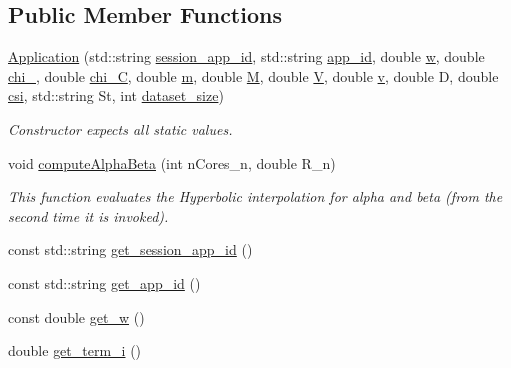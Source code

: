 \subsection*{Public Member Functions}
\begin{DoxyCompactItemize}
\item 
\hyperlink{classApplication_a3413eb5b5ba7bd2d1dfe2ce6d2e28c48}{Application} (std\-::string \hyperlink{classApplication_a6152c40564d526b9b60871c98f7a51c7}{session\-\_\-app\-\_\-id}, std\-::string \hyperlink{classApplication_a5cedee59cfd3cbf89d02174e2f521493}{app\-\_\-id}, double \hyperlink{classApplication_a89e171cf287b09ce4b37dd94c0d61e2b}{w}, double \hyperlink{classApplication_a6066fad4c229a6035652efd712d0d78c}{chi\-\_}, double \hyperlink{classApplication_a73d8a1604a2b2c99b14db1c8bd9c2798}{chi\-\_\-\-C}, double \hyperlink{classApplication_ad95ca8809237917d16779d7ed0013c8e}{m}, double \hyperlink{classApplication_a98cc47f6aa4ac3c70133d2922952ef7a}{M}, double \hyperlink{classApplication_a03a99fa3553c376653e53bb5f489c316}{V}, double \hyperlink{classApplication_a57853498c230af817bc4173169847bfc}{v}, double D, double \hyperlink{classApplication_a7c4d5b6d8d7b2c480008dbd958872ed2}{csi}, std\-::string St, int \hyperlink{classApplication_a83bcec93383a2816d9bbaa51b7dfa0c6}{dataset\-\_\-size})
\begin{DoxyCompactList}\small\item\em Constructor expects all static values. \end{DoxyCompactList}\item 
void \hyperlink{classApplication_a9e86a23b1be9e49c0a890f9cf1abb7fe}{compute\-Alpha\-Beta} (int n\-Cores\-\_\-n, double R\-\_\-n)
\begin{DoxyCompactList}\small\item\em This function evaluates the Hyperbolic interpolation for alpha and beta (from the second time it is invoked). \end{DoxyCompactList}\item 
const std\-::string \hyperlink{classApplication_a8c2e8eb2e76e8cb32ec7f6a41aba0758}{get\-\_\-session\-\_\-app\-\_\-id} ()
\item 
const std\-::string \hyperlink{classApplication_a4de60db623cbf250ea53805cd86cab06}{get\-\_\-app\-\_\-id} ()
\item 
const double \hyperlink{classApplication_a8fcbf0ab476dd0d53e7e20f37e3b0543}{get\-\_\-w} ()
\item 
double \hyperlink{classApplication_a19089a029251a3034747866c2084f4af}{get\-\_\-term\-\_\-i} ()
\item 

\end{DoxyCompactItemize}
